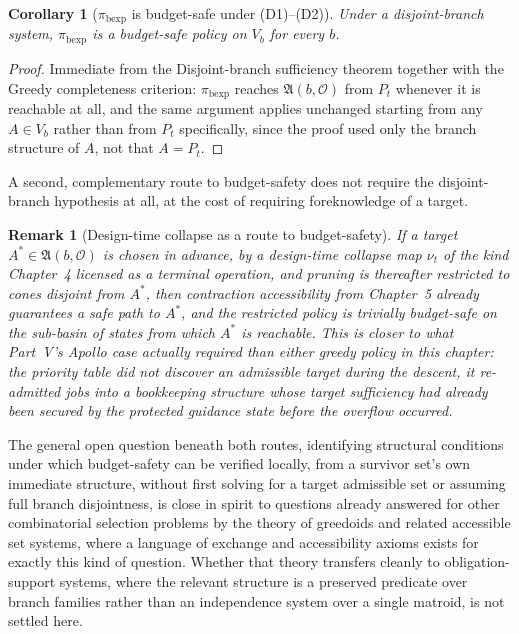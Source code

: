 \documentclass[11pt]{report}
\newtheorem{corollary}[definition]{Corollary}
\newtheorem{remark}[definition]{Remark}
\begin{document}
\begin{corollary}[$\pi_{\mathrm{bexp}}$ is budget-safe under (D1)–(D2)]
Under a disjoint-branch system, $\pi_{\mathrm{bexp}}$ is a budget-safe policy on $V_b$ for every $b$.
\end{corollary}
\begin{proof}
Immediate from the Disjoint-branch sufficiency theorem together with the Greedy completeness criterion: $\pi_{\mathrm{bexp}}$ reaches $\mathfrak A(b, \mathcal O)$ from $P_t$ whenever it is reachable at all, and the same argument applies unchanged starting from any $A \in V_b$ rather than from $P_t$ specifically, since the proof used only the branch structure of $A$, not that $A = P_t$.
\end{proof}

A second, complementary route to budget-safety does not require the disjoint-branch hypothesis at all, at the cost of requiring foreknowledge of a target.

\begin{remark}[Design-time collapse as a route to budget-safety]
If a target $A^\ast \in \mathfrak A(b, \mathcal O)$ is chosen in advance, by a design-time collapse map $\nu_t$ of the kind Chapter~4 licensed as a terminal operation, and pruning is thereafter restricted to cones disjoint from $A^\ast$, then contraction accessibility from Chapter~5 already guarantees a safe path to $A^\ast$, and the restricted policy is trivially budget-safe on the sub-basin of states from which $A^\ast$ is reachable. This is closer to what Part~V's Apollo case actually required than either greedy policy in this chapter: the priority table did not discover an admissible target during the descent, it re-admitted jobs into a bookkeeping structure whose target sufficiency had already been secured by the protected guidance state before the overflow occurred.
\end{remark}

The general open question beneath both routes, identifying structural conditions under which budget-safety can be verified locally, from a survivor set's own immediate structure, without first solving for a target admissible set or assuming full branch disjointness, is close in spirit to questions already answered for other combinatorial selection problems by the theory of greedoids and related accessible set systems, where a language of exchange and accessibility axioms exists for exactly this kind of question. Whether that theory transfers cleanly to obligation-support systems, where the relevant structure is a preserved predicate over branch families rather than an independence system over a single matroid, is not settled here.
\end{document}
